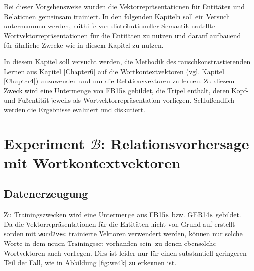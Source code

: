 Bei dieser Vorgehensweise wurden die Vektorrepräsentationen für Entitäten und Relationen gemeinsam trainiert. In den folgenden
Kapiteln soll ein Versuch unternommen werden, mithilfe von distributioneller Semantik erstellte Wortvektorrepräsentationen
für die Entitäten zu nutzen und darauf aufbauend für ähnliche Zwecke wie in diesem Kapitel zu nutzen.

In diesem Kapitel soll versucht werden, die Methodik des rauschkonstrastierenden Lernen aus Kapitel \ref{Chapter6}
auf die Wortkontextvektoren (vgl. Kapitel \ref{Chapter4}) anzuwenden und nur die Relationsvektoren zu lernen. Zu diesem Zweck
wird eine Untermenge von \textsc{FB15k} gebildet, die Tripel enthält, deren Kopf- und Fußentität jeweils als Wortvektorrepräsentation vorliegen.
Schlußendlich werden die Ergebnisse evaluiert und diskutiert.

\section{Experiment $\mathcal{B}$: Relationsvorhersage mit Wortkontextvektoren}

\subsection{Datenerzeugung}

Zu Trainingszwecken wird eine Untermenge aus \textsc{FB15k} bzw. \textsc{GER14k} gebildet. Da
die Vektorrepräsentationen für die Entitäten nicht von Grund auf erstellt sorden mit
\verb|word2vec| trainierte Vektoren verwendert werden, können nur solche Worte in dem
neuen Trainingsset vorhanden sein, zu denen ebensolche Wortvektoren auch vorliegen.
Dies ist leider nur für einen substantiell geringeren Teil der Fall, wie in Abbildung \ref{fig:we4k} zu
erkennen ist.

